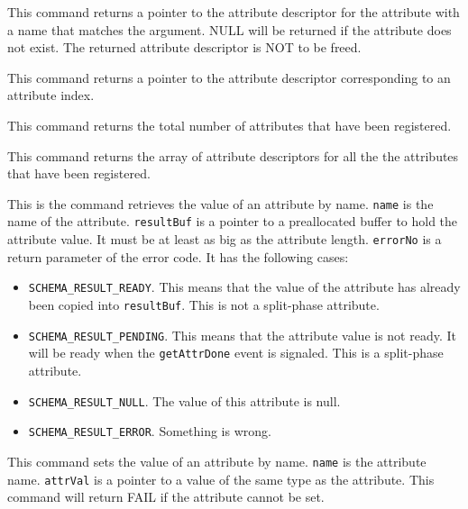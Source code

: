 \documentclass[11pt]{article}
\begin{document}
This command returns a pointer to the attribute descriptor
for the attribute with a name that matches the argument.
NULL will be returned if the attribute does not exist.
The returned attribute descriptor is NOT to be freed.



This command returns a pointer to the attribute descriptor
corresponding to an attribute index.



This command returns the total number of attributes that have been registered.



This command returns the array of attribute descriptors for all the
the attributes that have been registered.



This is the command retrieves the value of an attribute by name.
{\tt name} is the name of the attribute.  {\tt resultBuf} is a pointer to
a preallocated buffer to hold the attribute value.  It must be at least
as big as the attribute length.  {\tt errorNo} is a return parameter of
the error code.  It has the following cases:
\begin{itemize}
\item {\tt SCHEMA\_RESULT\_READY}.  This means
that the value of the attribute has already been copied into {\tt resultBuf}.
This is not a split-phase attribute.
\item {\tt SCHEMA\_RESULT\_PENDING}.  This means that
the attribute value is not ready.  It will be ready when the 
{\tt getAttrDone} event is signaled.  This is a split-phase attribute.
\item {\tt SCHEMA\_RESULT\_NULL}.  The value of this attribute is null.
\item {\tt SCHEMA\_RESULT\_ERROR}.  Something is wrong.
\end{itemize}



This command sets the value of an attribute by name.  {\tt name} is the attribute name.  {\tt attrVal} is a pointer to a value of the same type as the
attribute.  This command will return FAIL if the attribute cannot be set.


\end{document}
